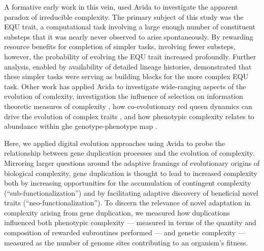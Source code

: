 A formative early work in this vein, \citet{lenski2003evolutionary} used Avida to investigate the apparent paradox of irreducible complexity.
The primary subject of this study was the EQU trait, a computational task involving a large enough number of constituent substeps that it was nearly never observed to arise spontaneously.
By rewarding resource benefits for completion of simpler tasks, involving fewer substeps, however, the probability of evolving the EQU trait increased profoundly.
Further analysis, enabled by availability of detailed lineage histories, demonstrated that these simpler tasks were serving as building blocks for the more complex EQU task.
Other work has applied Avida to investigate wide-ranging aspects of the evolution of comlexity, investigation the influence of selection on information theoretic measures of complexity \citep{Adami2000Evolution}, how co-evolutionary red queen dynamics can drive the evolution of complex traits \citep{Zaman2014Coevolution}, and how phenotypic complexity relates to abundance within ghe genotype-phenotype map \citep{Fortuna2017GenotypePhenotype}.

Here, we applied digital evolution approaches using Avida to probe the relationship between gene duplication processes and the evolution of complexity.
Mirroring larger questions around the adaptive framings of evolutionary origins of biological complexity, gene duplication is thought to lead to increased complexity both by increasing opportunities for the accumulation of contingent complexity (``sub-functionalization'') and by facilitating adaptive discovery of beneficial novel traits (``neo-functionalization'').
To discern the relevance of novel adaptation in complexity arising from gene duplication, we measured how duplications influenced both phenotypic complexity --- measured in terms of the quantity and composition of rewarded subroutines performed --- and genetic complexity --- measured as the number of genome sites contributing to an organism's fitness.

